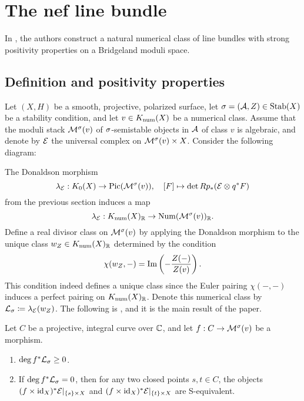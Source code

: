 
\section{The nef line bundle}
In \cite{BM}, the authors construct a natural numerical class of line bundles with strong positivity properties on a Bridgeland moduli space. 

\subsection{Definition and positivity properties}\label{positiveLBdefandprops}
Let $(X,H)$ be a smooth, projective, polarized surface, let $\sigma = (\mathcal{A}, Z) \in \operatorname{\mathrm{Stab}}(X)$ be a stability condition, and let $v \in K_{\mathrm{num}}(X)$ be a numerical class. Assume that the moduli stack $\mathcal{M}^\sigma(v)$ of $\sigma$-semistable objects in $\mathcal{A}$ of class $v$ is algebraic, and denote by $\mathcal{E}$ the universal complex on $\mathcal{M}^\sigma(v) \times X$. Consider the following diagram:
\begin{center}
\end{center}
The Donaldson morphism
\[ \lambda_{\mathcal{E}}: K_0(X) \to \mathrm{Pic}(\mathcal{M}^\sigma(v)), \quad [F] \mapsto \det R p_*(\mathcal{E} \otimes q^* F) \]
from the previous section induces a map 
\[ \lambda_{\mathcal{E}}: K_{\mathrm{num}}(X)_{\mathbb{R}} \to \mathrm{Num}(\mathcal{M}^\sigma(v))_{\mathbb{R}}. \]
Define a real divisor class on $\mathcal{M}^\sigma(v)$ by applying the Donaldson morphism to the unique class $w_Z \in K_{\mathrm{num}}(X)_{\mathbb{R}}$ determined by the condition
\[ \chi(w_Z, -) = \operatorname{\mathrm{Im}}\left(-\frac{Z(-)}{Z(v)}\right). \]
This condition indeed defines a unique class since the Euler pairing $\chi(-,-)$ induces a perfect pairing on $K_{\mathrm{num}}(X)_{\mathbb{R}}$. Denote this numerical class by $\mathcal{L}_\sigma \coloneqq \lambda_{\mathcal{E}}(w_Z)$. The following is \cite[Lemma 3.3]{BM}, and it is the main result of the paper.
\begin{thm}\label{BMpositivity}
    Let $C$ be a projective, integral curve over $\mathbb{C}$, and let $f: C \to \mathcal{M}^\sigma(v)$ be a morphism.
    \begin{enumerate}[(1)]
        \item $\deg f^* \mathcal{L}_\sigma \ge 0$.
        \item If $\deg f^* \mathcal{L}_\sigma = 0$, then for any two closed points $s, t \in C$, the objects \\ $(f \times \mathrm{id}_X)^*\mathcal{E}|_{\{s\} \times X}$ and $(f\times \mathrm{id}_X)^*\mathcal{E}|_{\{t\} \times X}$ are S-equivalent.
    \end{enumerate}
\end{thm}
